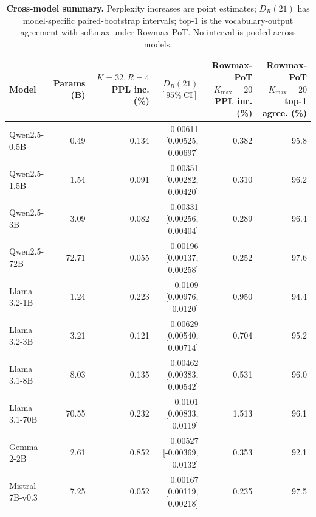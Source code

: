 \newcommand{\CrossModelSummaryTabular}{%
  \begingroup
  \setlength{\tabcolsep}{4.0pt}%
  \renewcommand{\arraystretch}{0.80}%
  \scriptsize
  \begin{tabular}{@{}lrrrrr@{}}
    \toprule
    Model & \shortstack{Params\\(B)} & \shortstack{$K{=}32,R{=}4$\\PPL inc. (\%)} & \shortstack{$D_R(21)$\\$[95\%\ \mathrm{CI}]$} & \shortstack{Rowmax-PoT $K_{\max}{=}20$\\PPL inc. (\%)} & \shortstack{Rowmax-PoT $K_{\max}{=}20$\\top-1 agree. (\%)} \\
    \midrule
  Qwen2.5-0.5B & 0.49 & 0.134 & 0.00611 [0.00525, 0.00697] & 0.382 & 95.8 \\
  Qwen2.5-1.5B & 1.54 & 0.091 & 0.00351 [0.00282, 0.00420] & 0.310 & 96.2 \\
  Qwen2.5-3B & 3.09 & 0.082 & 0.00331 [0.00256, 0.00404] & 0.289 & 96.4 \\
  Qwen2.5-72B & 72.71 & 0.055 & 0.00196 [0.00137, 0.00258] & 0.252 & 97.6 \\
  Llama-3.2-1B & 1.24 & 0.223 & 0.0109 [0.00976, 0.0120] & 0.950 & 94.4 \\
  Llama-3.2-3B & 3.21 & 0.121 & 0.00629 [0.00540, 0.00714] & 0.704 & 95.2 \\
  Llama-3.1-8B & 8.03 & 0.135 & 0.00462 [0.00383, 0.00542] & 0.531 & 96.0 \\
  Llama-3.1-70B & 70.55 & 0.232 & 0.0101 [0.00833, 0.0119] & 1.513 & 96.1 \\
  Gemma-2-2B & 2.61 & 0.852 & 0.00527 [-0.00369, 0.0132] & 0.353 & 92.1 \\
  Mistral-7B-v0.3 & 7.25 & 0.052 & 0.00167 [0.00119, 0.00218] & 0.235 & 97.5 \\
    \bottomrule
  \end{tabular}%
  \endgroup
}

\begin{table}[t]
  \centering
  \caption{\textbf{Cross-model summary.}  Perplexity increases are point estimates;
  \(D_R(21)\) has model-specific paired-bootstrap intervals; top-1 is the vocabulary-output
  agreement with softmax under Rowmax-PoT.  No interval is pooled across models.}
  \label{tab:crossmodel-summary}
  \CrossModelSummaryTabular
\end{table}
